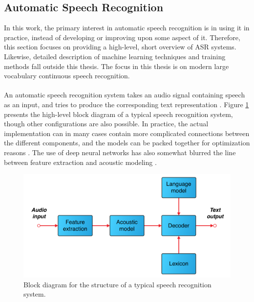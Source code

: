 \documentclass[english, 12pt, a4paper, pdftex, elec, utf8]{aaltothesis}
\begin{document}
\clearpage

\subsection{Automatic Speech Recognition} \label{subsec:asr}

In this work, the primary interest in automatic speech recognition is in using it in practice, instead of developing or improving upon some aspect of it. Therefore, this section focuses on providing a high-level, short overview of ASR systems. Likewise, detailed description of machine learning techniques and training methods fall outside this thesis. The focus in this thesis is on modern large vocabulary continuous speech recognition. \\\\ An automatic speech recognition system takes an audio signal containing speech as an input, and tries to produce the corresponding text representation \cite{huang2001spoken}. Figure \ref{fig:asr} presents the high-level block diagram of a typical speech recognition system, though other configurations are also possible. In practice, the actual implementation can in many cases contain more complicated connections between the different components, and the models can be packed together for optimization reasons \cite{yu2014automatic, kallasjoki2016}. The use of deep neural networks has also somewhat blurred the line between feature extraction and acoustic modeling \cite{hinton2012deep, kallasjoki2016}. \\
\begin{figure}[h]
	\centering 
	\includegraphics[trim={1.8cm 0cm 1.8cm 0cm}, clip, width=\textwidth]{ASR.pdf}
	\caption{Block diagram for the structure of a typical speech recognition system.}
	\label{fig:asr} 
\end{figure} \\
\end{document}
